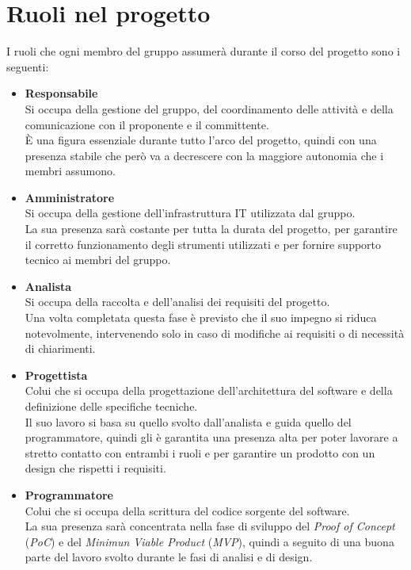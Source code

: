 \documentclass[a4paper,12pt]{article}
\begin{document}
    \section{Ruoli nel progetto} {
        I ruoli che ogni membro del gruppo assumerà durante il corso del progetto sono i seguenti:
        \begin{itemize}
            \item \textbf{Responsabile}\\
                Si occupa della gestione del gruppo, del coordinamento delle attività e della comunicazione con il proponente e il committente.\\
                È una figura essenziale durante tutto l'arco del progetto, quindi con una presenza stabile che però va a decrescere con la maggiore autonomia che i membri assumono. 
            \item \textbf{Amministratore}\\
                Si occupa della gestione dell'infrastruttura IT utilizzata dal gruppo.\\
                La sua presenza sarà costante per tutta la durata del progetto, per garantire il corretto funzionamento degli strumenti utilizzati e per fornire supporto tecnico ai membri del gruppo.
            \item \textbf{Analista}\\
                Si occupa della raccolta e dell'analisi dei requisiti del progetto.\\
                Una volta completata questa fase è previsto che il suo impegno si riduca notevolmente, intervenendo solo in caso di modifiche ai requisiti o di necessità di chiarimenti.
            \item \textbf{Progettista}\\
                Colui che si occupa della progettazione dell'architettura del software e della definizione delle specifiche tecniche.\\
                Il suo lavoro si basa su quello svolto dall'analista e guida quello del programmatore, quindi gli è garantita una presenza alta per poter lavorare a stretto contatto con entrambi i ruoli e per garantire un prodotto con un design che rispetti i requisiti.
            \item \textbf{Programmatore}\\
                Colui che si occupa della scrittura del codice sorgente del software.\\
                La sua presenza sarà concentrata nella fase di sviluppo del \textit{Proof of Concept} (\textit{PoC}) e del \textit{Minimun Viable Product} (\textit{MVP}), quindi a seguito di una buona parte del lavoro svolto durante le fasi di analisi e di design.

\end{itemize}}
\end{document}
